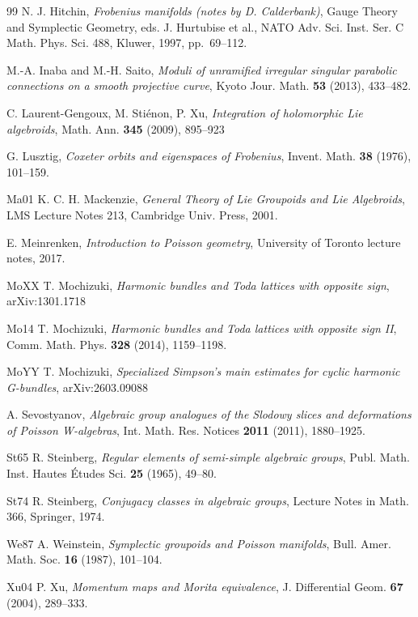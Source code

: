 \documentclass[a4paper,12pt,leqno]{amsart}
\numberwithin{equation}{section}
\theoremstyle{plain}
\theoremstyle{definition}
\begin{document}
\begin{thebibliography}{99}
N. J. Hitchin,
\emph{Frobenius manifolds (notes by D. Calderbank)},
Gauge Theory and Symplectic Geometry,
eds. J. Hurtubise et al.,
NATO Adv. Sci. Inst. Ser. C Math. Phys. Sci. 488,
Kluwer,
1997,
pp.~69--112.


M.-A. Inaba and M.-H. Saito,
\emph{Moduli of unramified irregular singular parabolic connections on a smooth projective curve},
Kyoto Jour. Math.
\textbf{53}
(2013),
433--482.

C. Laurent-Gengoux, M. Stiénon, P. Xu, \emph{Integration of holomorphic Lie algebroids},
Math. Ann.
\textbf{345}
(2009),
895--923

G. Lusztig,
\emph{Coxeter orbits and eigenspaces of Frobenius},
Invent. Math.
\textbf{38}
(1976),
101--159.

\bibitem
{Ma01}
 K. C. H.  Mackenzie,
{\em General Theory of Lie Groupoids and Lie Algebroids},
LMS Lecture Notes 213, Cambridge Univ. Press, 2001.

E. Meinrenken,
\emph{Introduction to Poisson geometry},
University of Toronto lecture notes, 2017.

\bibitem
{MoXX}
T. Mochizuki,
{\em Harmonic bundles and Toda lattices with opposite sign},
arXiv:1301.1718

\bibitem
{Mo14}
T. Mochizuki,
{\em Harmonic bundles and Toda lattices with opposite sign II},
Comm. Math. Phys. \textbf{328} (2014), 1159--1198.

\bibitem
{MoYY}
T. Mochizuki,
{\em Specialized Simpson's main estimates for cyclic harmonic G-bundles},
arXiv:2603.09088

A. Sevostyanov,
\emph{Algebraic group analogues of the Slodowy slices and deformations of Poisson W-algebras},
Int. Math. Res. Notices
\textbf{2011}
(2011),
1880--1925.

\bibitem
{St65} R. Steinberg,
\emph{Regular elements of semi-simple algebraic groups},
Publ. Math. Inst. Hautes \'Etudes Sci.
\textbf{25}
(1965),
49--80.

\bibitem
{St74} R. Steinberg,
\emph{ Conjugacy classes in algebraic groups},
Lecture Notes in Math. 366, Springer, 1974.

\bibitem
{We87}
A. Weinstein,
{\em Symplectic groupoids and Poisson manifolds},
Bull. Amer. Math. Soc. \textbf{16} (1987), 101--104.

\bibitem
{Xu04}
P. Xu,
\emph{Momentum maps and Morita equivalence},
J. Differential Geom. \textbf{67} (2004), 289--333.

\end{thebibliography}
\end{document}

